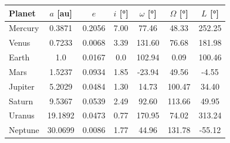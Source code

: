 \begin{tabular}{lSSSSSS}
\toprule
Planet &
{$a$      [\si{\astronomicalunit}]} &
{$e$}                               &
{$i$      [\si{\degree}]}           &
{$\omega$ [\si{\degree}]}           &
{$\Omega$ [\si{\degree}]}           &
{$L$      [\si{\degree}]}           \\
\midrule                                                                                      
Mercury &  0.3871 & 0.2056 &  7.00 &  77.46 &  48.33 & 252.25 \\
Venus   &  0.7233 & 0.0068 &  3.39 & 131.60 &  76.68 & 181.98 \\
Earth   &  1.0    & 0.0167 &  0.0  & 102.94 &   0.09 & 100.46 \\
Mars    &  1.5237 & 0.0934 &  1.85 & -23.94 &  49.56 &  -4.55 \\
Jupiter &  5.2029 & 0.0484 &  1.30 &  14.73 & 100.47 &  34.40 \\
Saturn  &  9.5367 & 0.0539 &  2.49 &  92.60 & 113.66 &  49.95 \\
Uranus  & 19.1892 & 0.0473 &  0.77 & 170.95 &  74.02 & 313.24 \\
Neptune & 30.0699 & 0.0086 &  1.77 &  44.96 & 131.78 & -55.12 \\
\bottomrule
\end{tabular}
